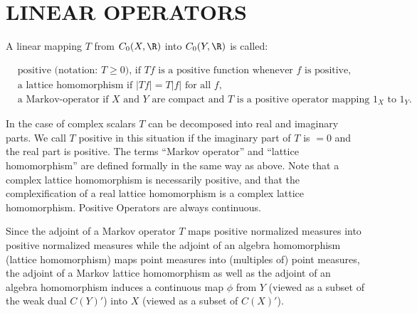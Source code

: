 
\section{LINEAR OPERATORS}
\label{sec:linear-operators}

A linear mapping $T$ from $C_{0}(X,\R)$ into $C_{0}(Y,\R)$ is called:

\[
\begin{aligned}
	&\text{positive (notation: } T \geq 0 \text{), if } Tf \text{ is a positive function whenever } f \text{ is positive,} \\
	&\text{a lattice homomorphism if } |Tf| = T|f| \text{ for all } f, \\
&\text{a Markov-operator if } X \text{ and } Y \text{ are compact and } T \text{ is a positive operator mapping } 1_{X} \text{ to } 1_{Y}.
\end{aligned}
\]

In the case of complex scalars $T$ can be decomposed into real and imaginary parts.
We call $T$ positive in this situation if the imaginary part of $T$ is $= 0$ and the real part is positive.
The terms \enquote{Markov operator} and \enquote{lattice homomorphism} are defined formally in the same way as above.
Note that a complex lattice homomorphism is necessarily positive, and that the complexification of a real lattice homomorphism is a complex lattice homomorphism.
Positive Operators are always continuous.

Since the adjoint of a Markov operator $T$ maps positive normalized measures into positive normalized measures while the adjoint of an algebra homomorphism (lattice homomorphism) maps point measures into (multiples of) point measures, the adjoint of a Markov lattice homomorphism as well as the adjoint of an algebra homomorphism induces a continuous map $\phi$ from $Y$ (viewed as a subset of the weak dual $C(Y)'$) into $X$ (viewed as a subset of $C(X)'$).

